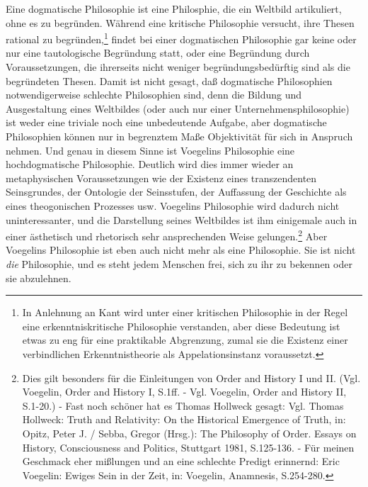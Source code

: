Eine dogmatische Philosophie ist eine Philosphie, die ein Weltbild
artikuliert, ohne es zu begründen. Während eine kritische Philosophie
versucht, ihre Thesen rational zu begründen,\footnote{In Anlehnung an Kant
  wird unter einer kritischen Philosophie in der Regel eine
  erkenntniskritische Philosophie verstanden, aber diese Bedeutung ist etwas
  zu eng für eine praktikable Abgrenzung, zumal sie die Existenz einer
  verbindlichen Erkenntnistheorie als Appelationsinstanz voraussetzt.} findet
bei einer dogmatischen Philosophie gar keine oder nur eine tautologische
Begründung statt, oder eine Begründung durch Voraussetzungen, die ihrerseits
nicht weniger begründungsbedürftig sind als die begründeten Thesen. Damit ist
nicht gesagt, daß dogmatische Philosophien notwendigerweise schlechte
Philosophien sind, denn die Bildung und Ausgestaltung eines Weltbildes (oder
auch nur einer Unternehmensphilosophie) ist weder eine triviale noch eine
unbedeutende Aufgabe, aber dogmatische Philosophien können nur in begrenztem
Maße Objektivität für sich in Anspruch nehmen. Und genau in diesem Sinne ist
Voegelins Philosophie eine hochdogmatische Philosophie. Deutlich wird dies
immer wieder an metaphysischen Voraussetzungen wie der Existenz eines
transzendenten Seinsgrundes, der Ontologie der Seinsstufen, der Auffassung der
Geschichte als eines theogonischen Prozesses usw. Voegelins Philosophie wird
dadurch nicht uninteressanter, und die Darstellung seines Weltbildes ist ihm
einigemale auch in einer ästhetisch und rhetorisch sehr ansprechenden Weise
gelungen.\footnote{Dies gilt besonders für die Einleitungen von Order and
  History I und II. (Vgl. Voegelin, Order and History I, S.1ff. - Vgl.
  Voegelin, Order and History II, S.1-20.) - Fast noch schöner hat es Thomas
  Hollweck gesagt: Vgl. Thomas Hollweck: Truth and Relativity: On the
  Historical Emergence of Truth, in: Opitz, Peter J. / Sebba, Gregor (Hrsg.):
  The Philosophy of Order. Essays on History, Consciousness and Politics,
  Stuttgart 1981, S.125-136. - Für meinen Geschmack eher mißlungen und an eine
  schlechte Predigt erinnernd: Eric Voegelin: Ewiges Sein in der Zeit, in:
  Voegelin, Anamnesis, S.254-280.} Aber Voegelins Philosophie ist eben auch
nicht mehr als eine Philosophie. Sie ist nicht {\it die} Philosophie, und es
steht jedem Menschen frei, sich zu ihr zu bekennen oder sie abzulehnen.

